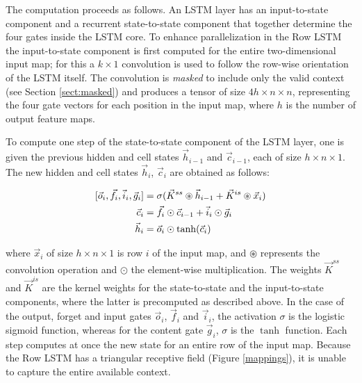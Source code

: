 The computation proceeds as follows. An LSTM layer has an {input-to-state} component and a recurrent {state-to-state} component that together determine the four gates inside the LSTM core. To enhance parallelization in the Row LSTM the input-to-state component is first computed for the entire two-dimensional input map; for this a $k \times 1$ convolution is used to follow the row-wise orientation of the LSTM itself. The convolution is \emph{masked} to include only the valid context (see Section \ref{sect:masked}) and produces a tensor of size $4h \times n \times n$, representing the four gate vectors for each position in the input map, where $h$ is the number of output feature maps.

 To compute one step of the state-to-state component of the LSTM layer, one is given the previous hidden and cell states $\vec{h}_{i-1}$ and $\vec{c}_{i-1}$, each of size $h \times n \times 1$. The new hidden and cell states $\vec{h}_i$, $\vec{c}_i$ are obtained as follows:

 \vspace{-0.2cm}
 \begin{equation}
 \begin{split}
 [\vec{o}_i, \vec{f}_i, \vec{i}_i, \vec{g}_i ] & = \sigma (\vec{K}^{ss} \circledast \vec{h}_{i-1} + \vec{K}^{is} \circledast \vec{x}_{i}) \\
\vec{c}_i & = \vec{f}_i \odot \vec{c}_{i-1} + \vec{i}_i \odot \vec{g}_i \\
\vec{h}_i & = \vec{o}_i \odot \tanh(\vec{c}_i)\\
\end{split}
\label{eq:lstm}
 \vspace{-0.3cm}
 \end{equation}

where $\vec{x}_i$ of size $h \times n \times 1$ is row $i$ of the input map, and $\circledast$ represents the convolution operation and $\odot$ the element-wise multiplication. The weights $\vec{K}^{ss}$ and $\vec{K}^{is}$ are the kernel weights for the state-to-state and the input-to-state components, where the latter is precomputed as described above. In the case of the output, forget and input gates $\vec{o}_i$, $\vec{f}_i$ and $\vec{i}_i$, the activation $\sigma$ is the logistic sigmoid function, whereas for the content gate $\vec{g}_i$, $\sigma$ is the $\tanh$ function. Each step computes at once the new state for an entire row of the input map. Because the Row LSTM has a triangular receptive field (Figure \ref{mappings}), it is unable to capture the entire available context.

